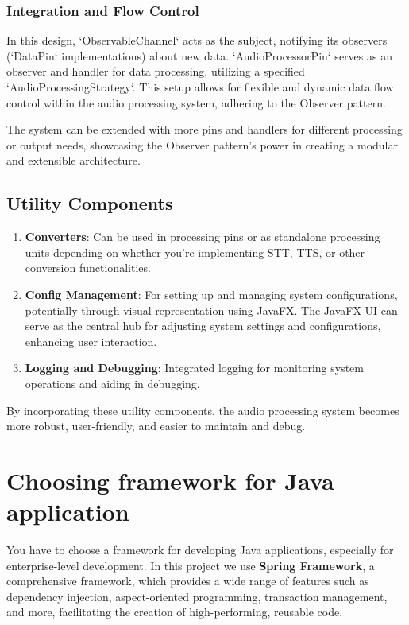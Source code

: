 \documentclass[a4paper,12pt]{article}
\begin{document}
\subsubsection*{Integration and Flow Control}
In this design, `ObservableChannel` acts as the subject, notifying its observers
(`DataPin` implementations) about new data.
`AudioProcessorPin` serves as an observer and handler for data processing,
utilizing a specified `AudioProcessingStrategy`.
This setup allows for flexible and dynamic data flow control within the audio processing system,
adhering to the Observer pattern.

The system can be extended with more pins and handlers for different processing or output needs,
showcasing the Observer pattern's power in creating a modular and extensible architecture.

\subsection{Utility Components}
\begin{enumerate}
  \item \textbf{Converters}: Can be used in processing pins or as standalone processing units
  depending on whether you're implementing STT, TTS, or other conversion functionalities.
  \item \textbf{Config Management}: For setting up and managing system configurations,
  potentially through visual representation using JavaFX. The JavaFX UI can serve as the central hub
  for adjusting system settings and configurations, enhancing user interaction.
  \item \textbf{Logging and Debugging}: Integrated logging for monitoring system operations
  and aiding in debugging.
\end{enumerate}

By incorporating these utility components, the audio processing system becomes more robust,
user-friendly, and easier to maintain and debug.

\section{Choosing framework for Java application}
You have to choose a framework for developing Java applications,
especially for enterprise-level development.
In this project we use \textbf{Spring Framework},
a comprehensive framework, which provides a wide range of features such as dependency injection,
aspect-oriented programming, transaction management, and more,
facilitating the creation of high-performing, reusable code.
\end{document}
